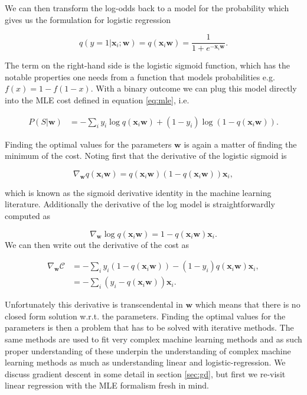 We can then transform the log-odds back to a model for the probability which gives us the formulation for logistic regression 

\begin{equation}
q(y=1 | \mathbf{x}_i; \mathbf{w})= q(\mathbf{x}_i\mathbf{w}) = \frac{1}{1 + e^{-\mathbf{x}_i \mathbf{w}}}.
\end{equation} 

\noindent The term on the right-hand side is the logistic sigmoid function, which has the notable properties one needs from a function that models probabilities e.g. $f(x) = 1-f(1-x)$. With a binary outcome we can plug this model directly into the MLE cost defined in equation \ref{eq:mle}, i.e. 

\begin{align}\label{eq:mle_lr}
P(S|\mathbf{w}) &=  - \sum_i y_i\log q (\mathbf{x}_i\mathbf{w}) + (1-y_i)\log\left(1-q(\mathbf{x}_i\mathbf{w})\right).
\end{align}

\noindent Finding the optimal values for the parameters $\mathbf{w}$ is again a matter of finding the minimum of the cost. Noting first that the derivative of the logistic sigmoid is 

\begin{equation}
\nabla_{\mathbf{w}} q(\mathbf{x}_i \mathbf{w}) = q(\mathbf{x}_i \mathbf{w}) (1 - q(\mathbf{x}_i \mathbf{w}))\mathbf{x}_i,
\end{equation}

\noindent which is known as the sigmoid derivative identity in the machine learning literature. Additionally the derivative of the log model is straightforwardly computed as 

\begin{equation}
\nabla_\mathbf{w} \log q(\mathbf{x}_i \mathbf{w}) = 1- q(\mathbf{x}_i \mathbf{w})\mathbf{x}_i.
\end{equation}
 We can then write out the derivative of the cost as 

\begin{align}
\nabla_{\mathbf{w}} \mathcal{C} &= - \sum_i y_i (1 - q(\mathbf{x}_i \mathbf{w})) - (1-y_i) q(\mathbf{x}_i \mathbf{w})\mathbf{x}_i, \\
&= - \sum_i \left(y_i -  q(\mathbf{x}_i \mathbf{w})\right)\mathbf{x}_i.
\end{align}

\noindent Unfortunately this derivative is transcendental in $\mathbf{w}$ which means that there is no closed form solution w.r.t. the parameters. Finding the optimal values for the parameters is then a problem that has to be solved with iterative methods. The same methods are used to fit very complex machine learning methods and as such proper understanding of these underpin the understanding of complex machine learning methods as much as understanding linear and logistic-regression. We discuss gradient descent in some detail in section \ref{sec:gd}, but first we re-visit linear regression with the MLE formalism fresh in mind.